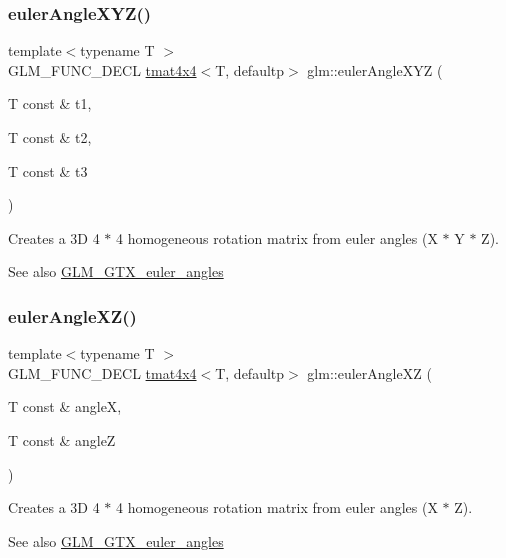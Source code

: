 \subsubsection{\texorpdfstring{euler\+Angle\+X\+Y\+Z()}{eulerAngleXYZ()}}
{\footnotesize\ttfamily template$<$typename T $>$ \\
G\+L\+M\+\_\+\+F\+U\+N\+C\+\_\+\+D\+E\+CL \hyperlink{structglm_1_1tmat4x4}{tmat4x4}$<$T, defaultp$>$ glm\+::euler\+Angle\+X\+YZ (\begin{DoxyParamCaption}\item[{T const \&}]{t1,  }\item[{T const \&}]{t2,  }\item[{T const \&}]{t3 }\end{DoxyParamCaption})}

Creates a 3D 4 $\ast$ 4 homogeneous rotation matrix from euler angles (X $\ast$ Y $\ast$ Z). \begin{DoxySeeAlso}{See also}
\hyperlink{group__gtx__euler__angles}{G\+L\+M\+\_\+\+G\+T\+X\+\_\+euler\+\_\+angles} 
\end{DoxySeeAlso}
\mbox{\label{group__gtx__euler__angles_gab2d7dc94b9a7519d741aaa208c7a335b}} 
\subsubsection{\texorpdfstring{euler\+Angle\+X\+Z()}{eulerAngleXZ()}}
{\footnotesize\ttfamily template$<$typename T $>$ \\
G\+L\+M\+\_\+\+F\+U\+N\+C\+\_\+\+D\+E\+CL \hyperlink{structglm_1_1tmat4x4}{tmat4x4}$<$T, defaultp$>$ glm\+::euler\+Angle\+XZ (\begin{DoxyParamCaption}\item[{T const \&}]{angleX,  }\item[{T const \&}]{angleZ }\end{DoxyParamCaption})}

Creates a 3D 4 $\ast$ 4 homogeneous rotation matrix from euler angles (X $\ast$ Z). \begin{DoxySeeAlso}{See also}
\hyperlink{group__gtx__euler__angles}{G\+L\+M\+\_\+\+G\+T\+X\+\_\+euler\+\_\+angles} 
\end{DoxySeeAlso}
\mbox{\label{group__gtx__euler__angles_gaeb193af1184bdf39c23636d756e1ff33}} 
